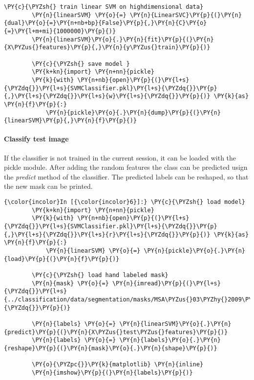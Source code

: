 \begin{Verbatim}[commandchars=\\\{\}]
        \PY{c}{\PYZsh{} train linear SVM on highdimensional data}
        \PY{n}{linearSVM} \PY{o}{=} \PY{n}{LinearSVC}\PY{p}{(}\PY{n}{dual}\PY{o}{=}\PY{n+nb+bp}{False}\PY{p}{,}\PY{n}{C}\PY{o}{=}\PY{l+m+mi}{1000000}\PY{p}{)}
        \PY{n}{linearSVM}\PY{o}{.}\PY{n}{fit}\PY{p}{(}\PY{n}{X\PYZus{}features}\PY{p}{,}\PY{n}{y\PYZus{}train}\PY{p}{)}
        
        \PY{c}{\PYZsh{} save model }
        \PY{k+kn}{import} \PY{n+nn}{pickle}
        \PY{k}{with} \PY{n+nb}{open}\PY{p}{(}\PY{l+s}{\PYZdq{}}\PY{l+s}{SVMClassifier.pkl}\PY{l+s}{\PYZdq{}}\PY{p}{,}\PY{l+s}{\PYZdq{}}\PY{l+s}{w}\PY{l+s}{\PYZdq{}}\PY{p}{)} \PY{k}{as} \PY{n}{f}\PY{p}{:}
            \PY{n}{pickle}\PY{o}{.}\PY{n}{dump}\PY{p}{(}\PY{n}{linearSVM}\PY{p}{,}\PY{n}{f}\PY{p}{)}
\end{Verbatim}


    \paragraph{Classify test image}


    If the classifier is not trained in the current session, it can be
loaded with the pickle module. After adding the random features the
class can be predicted usign the \emph{predict} method of the
classifier. The predicted labels can be reshaped, so that the new mask
can be printed.

    \begin{Verbatim}[commandchars=\\\{\}]
{\color{incolor}In [{\color{incolor}6}]:} \PY{c}{\PYZsh{} load model}
        \PY{k+kn}{import} \PY{n+nn}{pickle}
        \PY{k}{with} \PY{n+nb}{open}\PY{p}{(}\PY{l+s}{\PYZdq{}}\PY{l+s}{SVMClassifier.pkl}\PY{l+s}{\PYZdq{}}\PY{p}{,}\PY{l+s}{\PYZdq{}}\PY{l+s}{r}\PY{l+s}{\PYZdq{}}\PY{p}{)} \PY{k}{as} \PY{n}{f}\PY{p}{:}
            \PY{n}{linearSVM} \PY{o}{=} \PY{n}{pickle}\PY{o}{.}\PY{n}{load}\PY{p}{(}\PY{n}{f}\PY{p}{)}
            
        \PY{c}{\PYZsh{} load hand labeled mask}
        \PY{n}{mask} \PY{o}{=} \PY{n}{imread}\PY{p}{(}\PY{l+s}{\PYZdq{}}\PY{l+s}{../classification/data/segmentation/masks/MSA\PYZus{}03\PYZhy{}2009\PYZus{}dXXXX\PYZhy{}XX\PYZhy{}XX\PYZus{}s0200.tif}\PY{l+s}{\PYZdq{}}\PY{p}{)}
        
        \PY{n}{labels} \PY{o}{=} \PY{n}{linearSVM}\PY{o}{.}\PY{n}{predict}\PY{p}{(}\PY{n}{X\PYZus{}test\PYZus{}features}\PY{p}{)}
        \PY{n}{labels} \PY{o}{=} \PY{n}{labels}\PY{o}{.}\PY{n}{reshape}\PY{p}{(}\PY{n}{mask}\PY{o}{.}\PY{n}{shape}\PY{p}{)}
        
        \PY{o}{\PYZpc{}}\PY{k}{matplotlib} \PY{n}{inline}
        \PY{n}{imshow}\PY{p}{(}\PY{n}{labels}\PY{p}{)}
\end{Verbatim}


